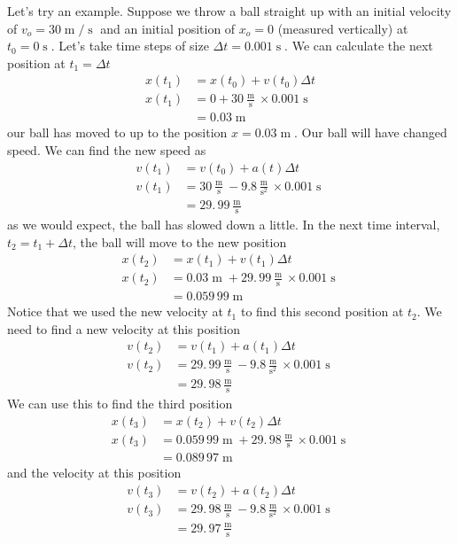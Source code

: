\documentclass[twoside,11pt,ShortChapTitles]{BYUTextbook}
\begin{document}
Let's try an example. Suppose we throw a ball straight up with an initial
velocity of $v_{o}=30 \operatorname{m} / \operatorname{s} $ and an initial position of $x_{o}=0$ (measured vertically) at $t_{0}=0 \operatorname{s} .$ Let's take time steps of size $\Delta t=0.001 \operatorname{s} .$ We can calculate the next position at $t_{1}=\Delta t$ 
\begin{align*}
x(t_{1})  & =x(t_{0})+v(t_{0})\Delta t\\
x(t_{1})  & =0+30\frac{ \operatorname{m} }{ \operatorname{s} }\times0.001 \operatorname{s} \\
& =0.03 \operatorname{m} \end{align*}
our ball has moved to up to the position $x=0.03 \operatorname{m} .$ Our ball will have changed speed. We can find the new speed as
\begin{align*}
v(t_{1})  & =v(t_{0})+a(t)\Delta t\\
v(t_{1})  & =30\frac{ \operatorname{m} }{ \operatorname{s} }-9.8\frac{ \operatorname{m} }{ \operatorname{s} ^{2}}\times0.001 \operatorname{s} \\
& =29.\,\allowbreak99\frac{ \operatorname{m} }{ \operatorname{s} } \end{align*}
as we would expect, the ball has slowed down a little. In the next time
interval, $t_{2}=t_{1}+\Delta t$, the ball will move to the new position
\begin{align*}
x(t_{2})  & =x(t_{1})+v(t_{1})\Delta t\\
x(t_{2})  & =0.03 \operatorname{m} +29.\,\allowbreak99\frac{ \operatorname{m} }{ \operatorname{s} }\times0.001 \operatorname{s} \\
& =0.059\,99 \operatorname{m} \end{align*}
Notice that we used the new velocity at $t_{1}$ to find this second position
at $t_{2}$. We need to find a new velocity at this position
\begin{align*}
v(t_{2})  & =v(t_{1})+a(t_{1})\Delta t\\
v(t_{2})  & =29.\,\allowbreak99\frac{ \operatorname{m} }{ \operatorname{s} }-9.8\frac{ \operatorname{m} }{ \operatorname{s} ^{2}}\times0.001 \operatorname{s} \\
& =29.\,\allowbreak98\frac{ \operatorname{m} }{ \operatorname{s} } \end{align*}
We can use this to find the third position 
\begin{align*}
x(t_{3})  & =x(t_{2})+v(t_{2})\Delta t\\
x(t_{3})  & =0.059\,99 \operatorname{m} +29.\,\allowbreak98\frac{ \operatorname{m} }{ \operatorname{s} }\times0.001 \operatorname{s} \\
& =0.089\,97 \operatorname{m} \end{align*}
and the velocity at this position \begin{align*}
v(t_{3})  & =v(t_{2})+a(t_{2})\Delta t\\
v(t_{3})  & =29.\,\allowbreak98\frac{ \operatorname{m} }{ \operatorname{s} }-9.8\frac{ \operatorname{m} }{ \operatorname{s} ^{2}}\times0.001 \operatorname{s} \\
& =29.\,\allowbreak97\frac{ \operatorname{m} }{ \operatorname{s} } \end{align*}
\end{document}
